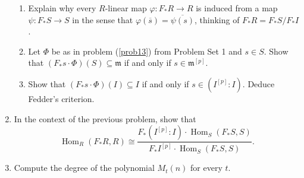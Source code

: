 \documentclass[12pt]{amsart}
\theoremstyle{definition}
\numberwithin{equation}{theorem}
\def\Hom{\operatorname{Hom}}
\def\frakm{\mathfrak{m}}
\def\phi{\varphi}
\def\to{\longrightarrow}
\begin{document}
\begin{enumerate}
\begin{enumerate}
\item Explain why every $R$-linear map $\phi: F_*R \to R$ is induced from a map $\psi:F_*S \to S$ in the sense that $\phi(\overline{s}) = \overline{\psi(s)}$, thinking of $F_*R = F_*S/ F_*I$.
\item Let $\Phi$ be as in problem (\ref{prob13}) from Problem Set 1 and $s\in S$. Show that $(F_*s \cdot \Phi)(S)\subseteq \frakm$ if and only if $s\in \frakm^{[p]}$.
\item Show that $(F_*s \cdot \Phi)(I) \subseteq I$ if and only if $s\in (I^{[p]} : I)$. Deduce Fedder's criterion.
\end{enumerate}
\item In the context of the previous problem, show that 
\[ \Hom_R(F_*R, R) \cong \frac{F_*(I^{[p]} :I)  \cdot \Hom_S(F_* S,S)}{F_* I^{[p]} \cdot \Hom_S(F_* S,S)}.\]
\item\footnotemark[2] Compute the degree of the polynomial $M_t(n)$ for every $t$.
\end{enumerate}

\null \vfill


\begin{comment}
\end{comment}
\end{document}
